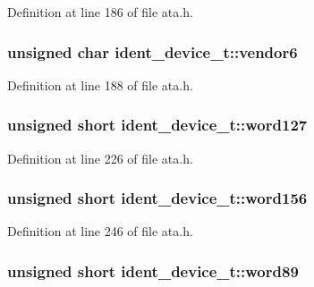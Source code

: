 Definition at line 186 of file ata.\+h.

\subsubsection[{\texorpdfstring{vendor6}{vendor6}}]{\setlength{\rightskip}{0pt plus 5cm}unsigned char ident\+\_\+device\+\_\+t\+::vendor6}\hypertarget{structident__device__t_a51b7a29370473491cdad8e6fbafce21a}{}\label{structident__device__t_a51b7a29370473491cdad8e6fbafce21a}


Definition at line 188 of file ata.\+h.

\subsubsection[{\texorpdfstring{word127}{word127}}]{\setlength{\rightskip}{0pt plus 5cm}unsigned short ident\+\_\+device\+\_\+t\+::word127}\hypertarget{structident__device__t_aafda7436375102d5165194c20b9c4861}{}\label{structident__device__t_aafda7436375102d5165194c20b9c4861}


Definition at line 226 of file ata.\+h.

\subsubsection[{\texorpdfstring{word156}{word156}}]{\setlength{\rightskip}{0pt plus 5cm}unsigned short ident\+\_\+device\+\_\+t\+::word156}\hypertarget{structident__device__t_ab2883d4ef22029232a95fc6c7fc1489b}{}\label{structident__device__t_ab2883d4ef22029232a95fc6c7fc1489b}


Definition at line 246 of file ata.\+h.

\subsubsection[{\texorpdfstring{word89}{word89}}]{\setlength{\rightskip}{0pt plus 5cm}unsigned short ident\+\_\+device\+\_\+t\+::word89}\hypertarget{structident__device__t_afe35780760139a739638cfe4e3b93fb9}{}\label{structident__device__t_afe35780760139a739638cfe4e3b93fb9}


